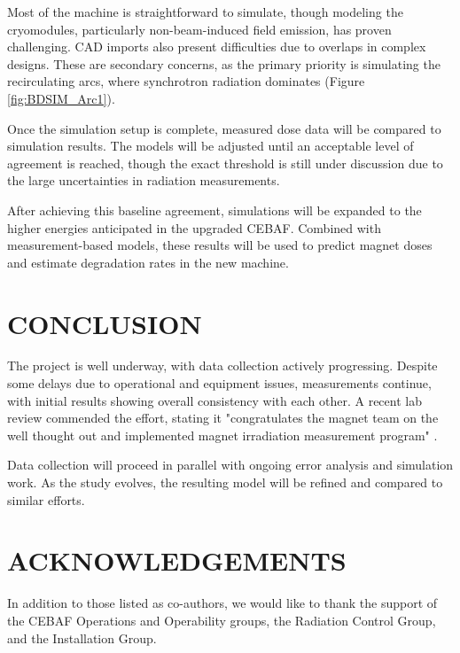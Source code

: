 \documentclass[a4paper,
               ]{jacow}
\begin{document}
Most of the machine is straightforward to simulate, though modeling the cryomodules, particularly non-beam-induced field emission, has proven challenging. CAD imports also present difficulties due to overlaps in complex designs. These are secondary concerns, as the primary priority is simulating the recirculating arcs, where synchrotron radiation dominates (Figure \ref{fig:BDSIM_Arc1}).

Once the simulation setup is complete, measured dose data will be compared to simulation results. The models will be adjusted until an acceptable level of agreement is reached, though the exact threshold is still under discussion due to the large uncertainties in radiation measurements.

After achieving this baseline agreement, simulations will be expanded to the higher energies anticipated in the upgraded CEBAF. Combined with measurement-based models, these results will be used to predict magnet doses and estimate degradation rates in the new machine.

\section{CONCLUSION}

The project is well underway, with data collection actively progressing. Despite some delays due to operational and equipment issues, measurements continue, with initial results showing overall consistency with each other. A recent lab review commended the effort, stating it "congratulates the magnet team on the well thought out and implemented magnet irradiation measurement program" \cite{JLAAC2025:Private}.

Data collection will proceed in parallel with ongoing error analysis and simulation work. As the study evolves, the resulting model will be refined and compared to similar efforts.

\section{ACKNOWLEDGEMENTS}
In addition to those listed as co-authors, we would like to thank the support of the CEBAF Operations and Operability groups, the Radiation Control Group, and the Installation Group.
\end{document}
